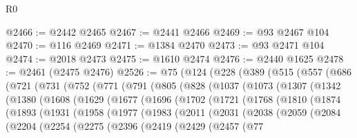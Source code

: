 \begin{lexlean}{R0}
\begin{coremodule}
@2466 := @2442 @2465
@2467 := @2441 @2466
@2469 := @93 @2467 @104
@2470 := @116 @2469
@2471 := @1384 @2470
@2473 := @93 @2471 @104
@2474 := @2018 @2473
@2475 := @1610 @2474
@2476 := @2440 @1625
@2478 := @2461 (@2475 @2476)
@2526 := @75
    (@124
      (@228
        (@389
          (@515
            (@557
              (@686
                (@721
                  (@731
                    (@752
                      (@771
                        (@791
                          (@805
                            (@828
                              (@1037
                                (@1073
                                  (@1307
                                    (@1342
                                      (@1380
                                        (@1608
                                          (@1629
                                            (@1677
                                              (@1696
                                                (@1702
                                                  (@1721
                                                    (@1768
                                                      (@1810
                                                        (@1874
                                                          (@1893
                                                            (@1931
                                                              (@1958
                                                                (@1977
                                                                  (@1983
                                                                    (@2011
                                                                      (@2031
                                                                        (@2038
                                                                          (@2059
                                                                            (@2084
                                                                              (@2204
                                                                                (@2254
                                                                                  (@2275
                                                                                    (@2396
                                                                                      (@2419
                                                                                        (@2429
                                                                                          (@2457
                                                                                            (@77

\end{coremodule}
\end{lexlean}
